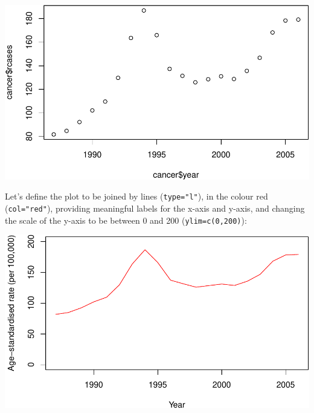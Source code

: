 \documentclass[
]{memoir}
\newenvironment{Shaded}{\begin{snugshade}}{\end{snugshade}}
\newcommand{\AttributeTok}[1]{\textcolor[rgb]{0.77,0.63,0.00}{#1}}
\newcommand{\DecValTok}[1]{\textcolor[rgb]{0.00,0.00,0.81}{#1}}
\newcommand{\FunctionTok}[1]{\textcolor[rgb]{0.00,0.00,0.00}{#1}}
\newcommand{\NormalTok}[1]{#1}
\newcommand{\SpecialCharTok}[1]{\textcolor[rgb]{0.00,0.00,0.00}{#1}}
\newcommand{\StringTok}[1]{\textcolor[rgb]{0.31,0.60,0.02}{#1}}
\begin{document}
\begin{Shaded}
\end{Shaded}

\includegraphics{phcm9795-R-notes_files/figure-latex/unnamed-chunk-49-1.pdf}

Let's define the plot to be joined by lines (\texttt{type="l"}), in the colour red (\texttt{col="red"}), providing meaningful labels for the x-axis and y-axis, and changing the scale of the y-axis to be between 0 and 200 (\texttt{ylim=c(0,200)}):

\begin{Shaded}
\end{Shaded}

\includegraphics{phcm9795-R-notes_files/figure-latex/unnamed-chunk-50-1.pdf}
\end{document}
